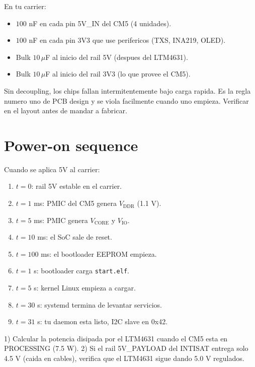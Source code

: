\documentclass[11pt,a4paper,oneside,openright]{book}
\begin{document}
En tu carrier:
\begin{itemize}[leftmargin=2em]
  \item $100$ nF en cada pin 5V\_IN del CM5 (4 unidades).
  \item $100$ nF en cada pin 3V3 que use perifericos (TXS, INA219, OLED).
  \item Bulk $10\,\mu$F al inicio del rail 5V (despues del LTM4631).
  \item Bulk $10\,\mu$F al inicio del rail 3V3 (lo que provee el CM5).
\end{itemize}

\begin{cuidado}
Sin decoupling, los chips fallan intermitentemente bajo carga rapida.
Es la regla numero uno de PCB design y se viola facilmente cuando uno
empieza. Verificar en el layout antes de mandar a fabricar.
\end{cuidado}

\section{Power-on sequence}

Cuando se aplica 5V al carrier:

\begin{enumerate}[leftmargin=2em]
  \item $t = 0$: rail 5V estable en el carrier.
  \item $t = 1$ ms: PMIC del CM5 genera $V_{\text{DDR}}$ (1.1 V).
  \item $t = 5$ ms: PMIC genera $V_{\text{CORE}}$ y $V_{\text{IO}}$.
  \item $t = 10$ ms: el SoC sale de reset.
  \item $t = 100$ ms: el bootloader EEPROM empieza.
  \item $t = 1$ s: bootloader carga \texttt{start.elf}.
  \item $t = 5$ s: kernel Linux empieza a cargar.
  \item $t = 30$ s: systemd termina de levantar servicios.
  \item $t = 31$ s: tu daemon esta listo, I2C slave en 0x42.
\end{enumerate}

\begin{ejercicio}
1) Calcular la potencia disipada por el LTM4631 cuando el CM5 esta en
PROCESSING (7.5 W). 2) Si el rail 5V\_PAYLOAD del INTISAT entrega
solo 4.5 V (caida en cables), verifica que el LTM4631 sigue dando
5.0 V regulados.
\end{ejercicio}
\end{document}
